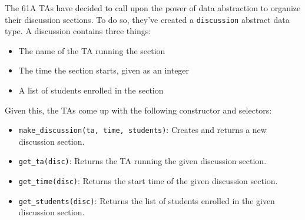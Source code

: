 The 61A TAs have decided to call upon the power of data abstraction to organize
their discussion sections. To do so, they've created a {\tt discussion}
abstract data type. A discussion contains three things:

\begin{itemize}
\item The name of the TA running the section
\item The time the section starts, given as an integer
\item A list of students enrolled in the section
\end{itemize}

Given this, the TAs come up with the following constructor and selectors:

\begin{itemize}
\item \texttt{make\_discussion(ta, time, students)}: Creates and returns a new
discussion section.
\item \texttt{get\_ta(disc)}: Returns the TA running the given discussion section.
\item \texttt{get\_time(disc)}: Returns the start time of the given discussion
section.
\item \texttt{get\_students(disc)}: Returns the list of students enrolled in the
given discussion section.
\end{itemize}
